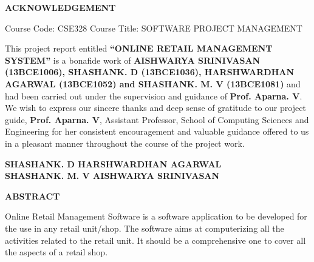 \documentclass{tcc}
\begin{document}
\newpage
\begin{center}
\textbf{ACKNOWLEDGEMENT}\\
\end{center}
\begin{flushleft}
Course Code: CSE328 \hspace{1.4cm} Course Title: SOFTWARE PROJECT MANAGEMENT\\
\end{flushleft}
This project report entitled \textbf{“ONLINE RETAIL MANAGEMENT SYSTEM”} is a bonafide work of \textbf{AISHWARYA SRINIVASAN (13BCE1006), SHASHANK. D (13BCE1036), HARSHWARDHAN AGARWAL (13BCE1052) and SHASHANK. M. V (13BCE1081)} and had been carried out under the supervision and guidance of \textbf{Prof. Aparna. V}. We wish to express our sincere thanks and deep sense of gratitude to our project guide, \textbf{Prof. Aparna. V}, Assistant Professor, School of Computing Sciences and Engineering for her consistent encouragement and valuable guidance offered to us in a pleasant manner throughout the course of the project work.\\
\vspace{0.2in}
\vfill
\begin{flushleft}
\textbf{SHASHANK. D \hspace{5.4cm} HARSHWARDHAN AGARWAL}\\
\textbf{SHASHANK. M. V \hspace{4.6cm} AISHWARYA SRINIVASAN}
\end{flushleft}

\newpage
\begin{center}
\textbf{\Large{ABSTRACT}}
\end{center}
\vspace{0.1in}
Online Retail Management Software is a software application to be developed for the use in any retail unit/shop. The software aims at computerizing all the activities related to the retail unit. It should be a comprehensive one to cover all the aspects of a retail shop.
\end{document}
